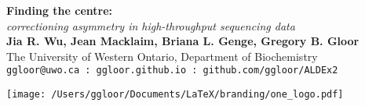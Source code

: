 \documentclass[a0,portrait]{a0poster}
\begin{document}


\begin{minipage}[b]{0.75\linewidth}
\veryHuge \color{NavyBlue} \textbf{Finding the centre:} \color{Black}\\ %
\Huge\textit{ correctioning asymmetry in high-throughput sequencing data}\\[2cm] %
\huge \textbf{Jia R. Wu, Jean Macklaim, Briana L. Genge, Gregory B. Gloor}\\[0.5cm] %
\huge The University of Western Ontario, Department of Biochemistry\\[0.4cm] %
\Large \texttt{ggloor@uwo.ca : ggloor.github.io : github.com/ggloor/ALDEx2}\\
\end{minipage}
%
\begin{minipage}[b]{0.25\linewidth}
\texttt{[image: /Users/ggloor/Documents/LaTeX/branding/one\_logo.pdf]}\\
\end{minipage}

\vspace{0cm} %

\end{document}
